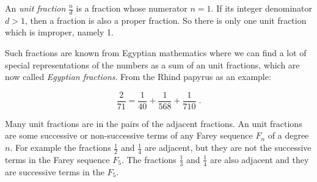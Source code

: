 \documentclass[12pt]{article}
\begin{document}
An {\it unit fraction} $\frac{n}{d}$ is a fraction whose numerator $n = 1$. 
If its integer denominator $d > 1$, then a fraction is also a proper fraction. So there is only one unit fraction which is improper, namely 1.

Such fractions are known from Egyptian mathematics where we can find a lot of special representations of the numbers as a sum of an unit fractions, which are now called {\it Egyptian fractions}. From the Rhind papyrus as an example:

$$\frac{2}{71} = \frac{1}{40} + \frac{1}{568} + \frac{1}{710} \; . $$

Many unit fractions are in the pairs of the adjacent fractions. An unit fractions are some successive or non-successive terms of any Farey sequence $F_{n}$ of a degree $n$. For example the fractions $\frac{1}{2}$ and $\frac{1}{4}$ are adjacent, but they are not the successive terms in the Farey sequence $F_{5}$. The fractions $\frac{1}{3}$ and $\frac{1}{4}$ are also adjacent and they are successive terms in the $F_{5}$.
\end{document}

